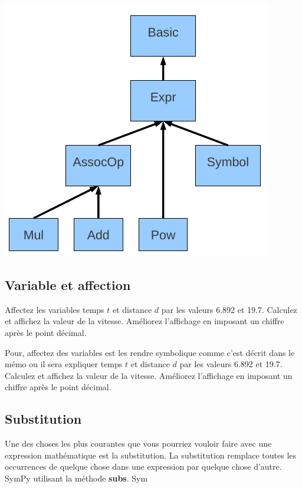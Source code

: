 \includegraphics[scale=0.5]{../Pictures/sympyarch.png} 
\subsection{Variable et affection}

\begin{exercise}
Affectez les variables temps $t$ et distance $d$ par les valeurs 6.892 et 19.7. Calculez et affichez la valeur de la vitesse. Améliorez l'affichage en imposant un chiffre après le point décimal.
\end{exercise}

\begin{solution}
Pour, affectez des variables est les rendre symbolique comme c'est décrit dans le mémo ou il 
sera expliquer temps $t$ et distance $d$ par les valeurs 6.892 et 19.7. Calculez et affichez la 
valeur de la vitesse. Améliorez l'affichage en imposant un chiffre après le point décimal.
\end{solution}

\subsection{Substitution}
Une des choses les plus courantes que vous pourriez vouloir faire avec une expression mathématique est la substitution. La substitution remplace toutes les occurrences de quelque chose dans une expression par quelque chose d'autre. SymPy utilisant la méthode \textbf{subs}. Sym

